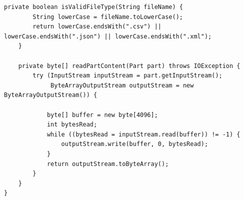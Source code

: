 \begin{lstlisting}[style=java]
    private boolean isValidFileType(String fileName) {
        String lowerCase = fileName.toLowerCase();
        return lowerCase.endsWith(".csv") || lowerCase.endsWith(".json") || lowerCase.endsWith(".xml");
    }
    
    private byte[] readPartContent(Part part) throws IOException {
        try (InputStream inputStream = part.getInputStream();
             ByteArrayOutputStream outputStream = new ByteArrayOutputStream()) {
            
            byte[] buffer = new byte[4096];
            int bytesRead;
            while ((bytesRead = inputStream.read(buffer)) != -1) {
                outputStream.write(buffer, 0, bytesRead);
            }
            return outputStream.toByteArray();
        }
    }
}
\end{lstlisting}


